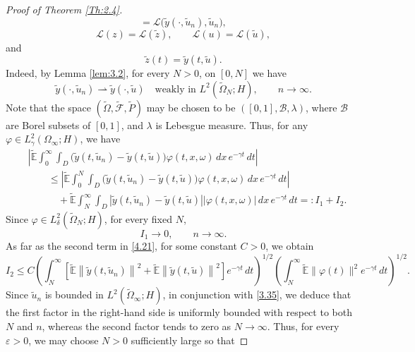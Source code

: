 \documentclass[10pt,a4paper]{amsart}
\begin{document}
\begin{proof}[Proof of Theorem \ref{Th:2.4}]
\[=
\mathcal{L}\bigl(\widetilde{y}(\cdot,\widetilde{u}_n),
\widetilde{u}_n\bigr),
\]
\[
\mathcal{L}(z)=\mathcal{L}(\widetilde{z}),
\qquad
\mathcal{L}(u)=\mathcal{L}(\widetilde{u}),
\]
and
\[
\widetilde{z}(t)
=
\widetilde{y}(t,\widetilde{u}).
\]
Indeed, by Lemma \ref{lem:3.2}, for every $N>0$, on $[0,N]$ we have
\begin{equation}
\widetilde{y}(\cdot,\widetilde{u}_n)
\rightharpoonup
\widetilde{y}(\cdot,\widetilde{u})
\quad\text{weakly in }
L^2(\widetilde{\Omega}_N;H),
\qquad n\to\infty.
\end{equation}
Note that the space $(\widetilde{\Omega}, \widetilde{\mathcal{F}}, \widetilde{P})$ may be chosen to be $([0,1], \mathcal{B}, \lambda)$, where $\mathcal{B}$ are Borel subsets of $[0,1]$, and $\lambda$ is Lebesgue measure. Thus, for any
$\varphi\in L_\gamma^2(\Omega_\infty;H)$, we have
\begin{align}
&\left|
\widetilde{\mathbb{E}}
\int_0^\infty
\int_D
\bigl(
\widetilde{y}(t,\widetilde{u}_n)
-
\widetilde{y}(t,\widetilde{u})
\bigr)
\varphi(t,x,\omega)\,dx\,
e^{-\gamma t}\,dt
\right|
\nonumber\\
&\qquad\leq
\left|
\widetilde{\mathbb{E}}
\int_0^N
\int_D
\bigl(
\widetilde{y}(t,\widetilde{u}_n)
-
\widetilde{y}(t,\widetilde{u})
\bigr)
\varphi(t,x,\omega)\,dx\,
e^{-\gamma t}\,dt
\right|
\nonumber\\
&\qquad\quad+
\widetilde{\mathbb{E}}
\int_N^\infty
\int_D
\left|
\widetilde{y}(t,\widetilde{u}_n)
-
\widetilde{y}(t,\widetilde{u})
\right|
\left|
\varphi(t,x,\omega)
\right|\,dx\,
e^{-\gamma t}\,dt
=: I_1+I_2.
\label{4.21}
\end{align}
Since $\varphi\in L_\delta^2(\widetilde{\Omega}_N;H)$,
for every fixed $N$,
\begin{equation}
I_1 \to 0,
\qquad n\to\infty.
\label{4.22}
\end{equation}
As far as the second term in \eqref{4.21}, for some constant $C>0$, we
obtain
\[
I_2
\leq
C
\left(
\int_N^\infty
\left[
\widetilde{\mathbb{E}}
\left\|
\widetilde{y}(t,\widetilde{u}_n)
\right\|^2
+
\widetilde{\mathbb{E}}
\left\|
\widetilde{y}(t,\widetilde{u})
\right\|^2
\right]
e^{-\gamma t}\,dt
\right)^{1/2}
\left(
\int_N^\infty
\widetilde{\mathbb{E}}
\|\varphi(t)\|^2
e^{-\gamma t}\,dt
\right)^{1/2}.
\]
Since $\widetilde{u}_n$ is bounded in
$L^2(\widetilde{\Omega}_\infty;H)$, in conjunction with \eqref{3.35}, we deduce that the first factor in the
right-hand side is uniformly bounded with respect to both $N$ and $n$,
whereas the second factor tends to zero as $N\to\infty$. Thus, for
every $\varepsilon>0$, we may choose $N>0$ sufficiently large so that

\end{proof}
\end{document}
